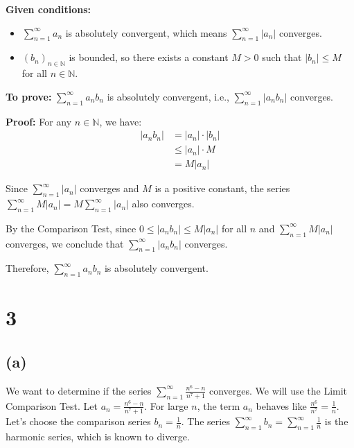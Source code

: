 \documentclass[12pt,a4paper]{article}
\theoremstyle{definition}
\theoremstyle{remark}
\begin{document}
\textbf{Given conditions:}
\begin{itemize}
    \item $\sum_{n=1}^{\infty} a_n$ is absolutely convergent, which means $\sum_{n=1}^{\infty} |a_n|$ converges.
    \item $(b_n)_{n \in \mathbb{N}}$ is bounded, so there exists a constant $M > 0$ such that $|b_n| \leq M$ for all $n \in \mathbb{N}$.
\end{itemize}

\textbf{To prove:} $\sum_{n=1}^{\infty} a_n b_n$ is absolutely convergent, i.e., $\sum_{n=1}^{\infty} |a_n b_n|$ converges.

\textbf{Proof:}
For any $n \in \mathbb{N}$, we have:
\begin{align*}
    |a_n b_n| &= |a_n| \cdot |b_n| \\
    &\leq |a_n| \cdot M \\
    &= M |a_n|
\end{align*}

Since $\sum_{n=1}^{\infty} |a_n|$ converges and $M$ is a positive constant, the series $\sum_{n=1}^{\infty} M |a_n| = M \sum_{n=1}^{\infty} |a_n|$ also converges.

By the Comparison Test, since $0 \leq |a_n b_n| \leq M |a_n|$ for all $n$ and $\sum_{n=1}^{\infty} M |a_n|$ converges, we conclude that $\sum_{n=1}^{\infty} |a_n b_n|$ converges.

Therefore, $\sum_{n=1}^{\infty} a_n b_n$ is absolutely convergent.
\section*{3}
\subsection*{(a)}
We want to determine if the series $\sum_{n=1}^{\infty} \frac{n^6 - n}{n^7 + 1}$ converges.
We will use the Limit Comparison Test. Let $a_n = \frac{n^6 - n}{n^7 + 1}$.
For large $n$, the term $a_n$ behaves like $\frac{n^6}{n^7} = \frac{1}{n}$.
Let's choose the comparison series $b_n = \frac{1}{n}$. The series $\sum_{n=1}^{\infty} b_n = \sum_{n=1}^{\infty} \frac{1}{n}$ is the harmonic series, which is known to diverge.
\end{document}
